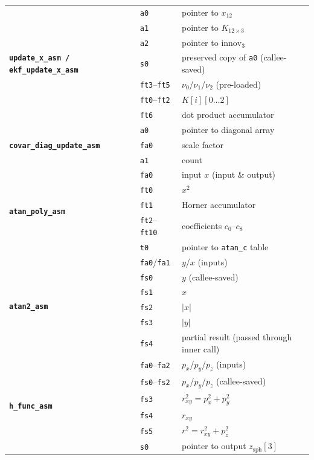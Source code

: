 \documentclass[12pt,a4paper]{article}
\newcommand{\reg}[1]{\texttt{\color{reg}#1}}
\newcommand{\func}[1]{\texttt{\bfseries #1}}
\begin{document}
\begin{longtable}{p{3.8cm}p{2.2cm}p{8.2cm}}
\multirow{7}{*}{\func{update\_x\_asm / ekf\_update\_x\_asm}}
  & \reg{a0}   & pointer to $x_{12}$ \\
  & \reg{a1}   & pointer to $K_{12\times3}$ \\
  & \reg{a2}   & pointer to $\text{innov}_3$ \\
  & \reg{s0}   & preserved copy of \reg{a0} (callee-saved) \\
  & \reg{ft3}--\reg{ft5} & $\nu_0$/$\nu_1$/$\nu_2$ (pre-loaded) \\
  & \reg{ft0}--\reg{ft2} & $K[i][0\ldots2]$ \\
  & \reg{ft6}  & dot product accumulator \\
\midrule

\multirow{3}{*}{\func{covar\_diag\_update\_asm}}
  & \reg{a0}   & pointer to diagonal array \\
  & \reg{fa0}  & scale factor \\
  & \reg{a1}   & count \\
\midrule

\multirow{5}{*}{\func{atan\_poly\_asm}}
  & \reg{fa0}  & input $x$ (input \& output) \\
  & \reg{ft0}  & $x^2$ \\
  & \reg{ft1}  & Horner accumulator \\
  & \reg{ft2}--\reg{ft10} & coefficients $c_0$--$c_8$ \\
  & \reg{t0}   & pointer to \texttt{atan\_c} table \\
\midrule

\multirow{6}{*}{\func{atan2\_asm}}
  & \reg{fa0}/\reg{fa1} & $y$/$x$ (inputs) \\
  & \reg{fs0}  & $y$ (callee-saved) \\
  & \reg{fs1}  & $x$ \\
  & \reg{fs2}  & $|x|$ \\
  & \reg{fs3}  & $|y|$ \\
  & \reg{fs4}  & partial result (passed through inner call) \\
\midrule

\multirow{6}{*}{\func{h\_func\_asm}}
  & \reg{fa0}--\reg{fa2} & $p_x$/$p_y$/$p_z$ (inputs) \\
  & \reg{fs0}--\reg{fs2} & $p_x$/$p_y$/$p_z$ (callee-saved) \\
  & \reg{fs3}  & $r_{xy}^2 = p_x^2+p_y^2$ \\
  & \reg{fs4}  & $r_{xy}$ \\
  & \reg{fs5}  & $r^2 = r_{xy}^2 + p_z^2$ \\
  & \reg{s0}   & pointer to output $z_{\text{sph}}[3]$ \\
\midrule


\end{longtable}
\end{document}

